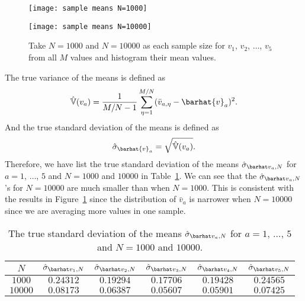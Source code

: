 \begin{figure}
    \centering
    \begin{minipage}[t]{0.8\linewidth}
        \centering
        \texttt{[image: sample means N=1000]}
        \label{fig:hist_mean:a}
    \end{minipage}
    \hfill
    \begin{minipage}[t]{0.8\linewidth}
        \centering
        \texttt{[image: sample means N=10000]}
        \label{fig:hist_mean:b}
    \end{minipage}
    \caption{Take \(N = 1000\) and \(N = 10000\) as each sample size
        for \(v_1\), \(v_2\), \(\ldots\), \(v_5\) from all \(M\) values
        and histogram their mean values.}
    \label{fig:hist_mean}
\end{figure}

The true variance of the means is defined as
%
\begin{equation}\label{eq:varva}
    \hat{\mathbb{V}}(v_a) = \frac{ 1 }{ M/N - 1 }
    \sum_{\eta=1}^{M/N} (\bar{v}_{a,\eta} - \barhat{v}_a)^2.
\end{equation}
%
And the true standard deviation of the means is defined as
%
\begin{equation}
    \hat{\sigma}_{\barhat{v}_a} = \sqrt{\hat{\mathbb{V}}(v_a)}.
\end{equation}
%
Therefore, we have list the true standard deviation of the means
\(\sgbar{a}\) for \(a = 1\), \(\ldots\), \(5\) and \(N = 1000\) and \(10000\)
in Table~\ref{tab:truestd}.
We can see that the \(\sgbar{a}\)'s for \(N = 10000\) are much smaller than
when \(N = 1000\). This is consistent with the results in Figure~\ref{fig:hist_mean}
since the distribution of \(\bar{v}_a\) is narrower when \(N = 10000\) since
we are averaging more values in one sample.

\begin{table}[H]
    \centering
    \caption{The true standard deviation of the means
        \(\sgbar{a}\) for \(a = 1\), \(\ldots\), \(5\) and \(N = 1000\) and \(10000\).}
    \label{tab:truestd}
    \begin{tabular}{@{}cccccc@{}}
        \toprule
        \(N\)     & \(\sgbar{1}\) & \(\sgbar{2}\) & \(\sgbar{3}\) & \(\sgbar{4}\) & \(\sgbar{5}\) \\
        \midrule
        \(1000\)  & \(0.24312\)   & \(0.19294\)   & \(0.17706\)   & \(0.19428\)   & \(0.24565\)   \\
        \(10000\) & \(0.08173\)   & \(0.06387\)   & \(0.05607\)   & \(0.05901\)   & \(0.07425\)   \\
        \bottomrule
    \end{tabular}
\end{table}


